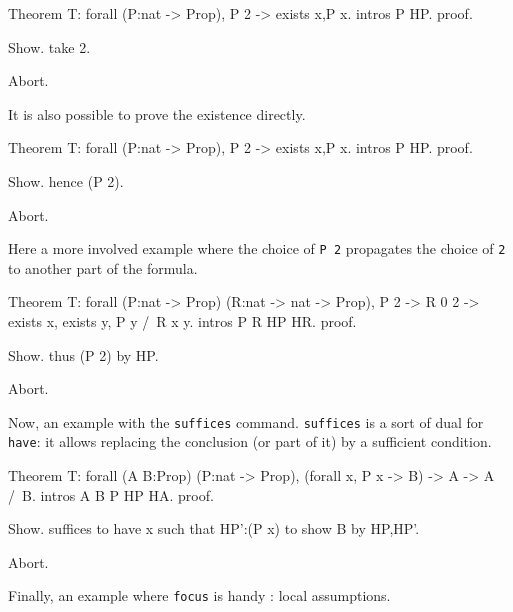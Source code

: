 \begin{coq_eval}
Theorem T: forall (P:nat -> Prop), P 2 -> exists x,P x.
intros P HP.
proof.
\end{coq_eval} 
\begin{coq_example}
Show.
take 2.
\end{coq_example}
\begin{coq_eval}
Abort.
\end{coq_eval}

It is also possible to prove the existence directly.

\begin{coq_eval}
Theorem T: forall (P:nat -> Prop), P 2 -> exists x,P x.
intros P HP.
proof.
\end{coq_eval} 
\begin{coq_example}
Show.
hence (P 2).
\end{coq_example}
\begin{coq_eval}
Abort.
\end{coq_eval}

Here a more involved example where the choice of {\tt P 2} propagates
the choice of {\tt 2} to another part of the formula.

\begin{coq_eval}
Theorem T: forall (P:nat -> Prop) (R:nat -> nat -> Prop), P 2 -> R 0 2 -> exists x, exists y, P y /\ R x y.
intros P R HP HR.
proof.
\end{coq_eval} 
\begin{coq_example}
Show.
thus (P 2) by HP.
\end{coq_example}
\begin{coq_eval}
Abort.
\end{coq_eval}

Now, an example with the {\tt suffices} command. {\tt suffices}
is a sort of dual for {\tt have}: it allows replacing the conclusion
(or part of it) by a sufficient condition. 

\begin{coq_eval}
Theorem T: forall (A B:Prop) (P:nat -> Prop), (forall x, P x -> B) -> A -> A /\ B.
intros A B P HP HA.
proof.
\end{coq_eval} 
\begin{coq_example}
Show.
suffices to have x such that HP':(P x) to show B by HP,HP'.
\end{coq_example}
\begin{coq_eval}
Abort.
\end{coq_eval}

Finally, an example where {\tt focus} is handy : local assumptions.  

